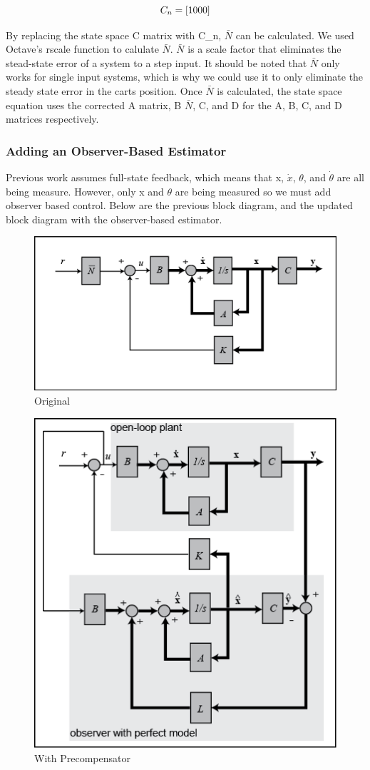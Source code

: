 \documentclass{article}
\begin{document}
\begin{equation}
\label{pcomp}
\centering
C_n = [1 0 0 0]
\end{equation}
 
 By replacing the state space C matrix with C\_n, $\bar{N}$ can be calculated. We used Octave's rscale function to calulate $\bar{N}$. $\bar{N}$ is a scale factor that eliminates the stead-state error of a system to a step input. It should be noted that $\bar{N}$ only works for single input systems, which is why we could use it to only eliminate the steady state error in the carts position. Once $\bar{N}$ is calculated, the state space equation uses the corrected A matrix, B $\bar{N}$, C, and D for the A, B, C, and D matrices respectively.
 
 \subsubsection{Adding an Observer-Based Estimator}
 Previous work assumes full-state feedback, which means that x, $\dot{x}$, $\theta$, and $\dot{\theta}$ are all being measure. However, only x and $\theta$ are being measured so we must add observer based control. Below are the previous block diagram, and the updated block diagram with the observer-based estimator.

\begin{figure}[!htb]
\centering
  \includegraphics[width=.7\linewidth]{blockd}
  \caption{Original}
  \label{bd}
  \end{figure}

\begin{figure}[!htb]
  \includegraphics[width=.6\linewidth]{observer_blockd}
  \caption{With Precompensator}
  \label{bd2}
\end{figure}
\end{document}
